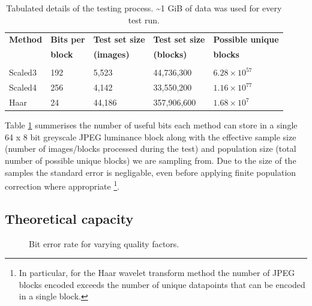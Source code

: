 \begin{table}[tbph]
  \begin{center}
        \begin{tabular}{l l l l l}
        \textbf{Method} &\textbf{Bits per} &\textbf{Test set size} & \textbf{Test set size} &\textbf{Possible unique} \\ 
            &\textbf{block} &\textbf{(images)} &\textbf{(blocks)} &\textbf{blocks} \\ [0.1ex] \hline \\ [-1.5ex]
        Scaled3	&192	&5,523	&44,736,300	& $6.28 \times 10^{57}$ \\
        Scaled4	&256	&4,142	&33,550,200	& $1.16 \times 10^{77}$ \\
        Haar	&24	&44,186	&357,906,600	& $1.68 \times 10^{7}$ \\
        \end{tabular}
        \caption{Tabulated details of the testing process. \textasciitilde 1 GiB of data was used for every test run.}
        \label{tab:img-test}
    \end{center}
\end{table}

Table \ref{tab:img-test} summerises the number of useful bits each method can store in a single 64 x 8 bit greyscale JPEG luminance block along with the effective sample size (number of images/blocks processed during the test) and population size (total number of possible unique blocks) we are sampling from. Due to the size of the samples the standard error is negligable, even before applying finite population correction where appropriate \footnote{In particular, for the Haar wavelet transform method the number of JPEG blocks encoded exceeds the number of unique datapoints that can be encoded in a single block.}. 


\subsection{Theoretical capacity}

\begin{figure}[tbph]
  \begin{center}
    \caption{Bit error rate for varying quality factors.}
    \label{graph:ber}
  \end{center}
\end{figure}

